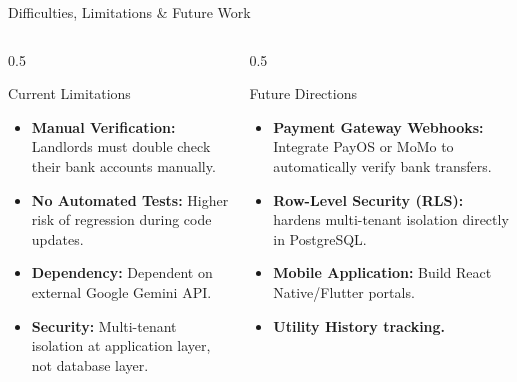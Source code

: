 \documentclass[10pt]{beamer}
\begin{document}
\begin{frame}{Difficulties, Limitations \& Future Work}
    \begin{columns}
        \begin{column}{0.5\textwidth}
            \begin{block}{Current Limitations}
                \begin{itemize}
                    \item \textbf{Manual Verification:} Landlords must double check their bank accounts manually.
                    \item \textbf{No Automated Tests:} Higher risk of regression during code updates.
                    \item \textbf{Dependency:} Dependent on external Google Gemini API.
                    \item \textbf{Security:} Multi-tenant isolation at application layer, not database layer.
                \end{itemize}
            \end{block}
        \end{column}
        
        \begin{column}{0.5\textwidth}
            \begin{block}{Future Directions}
                \begin{itemize}
                    \item \textbf{Payment Gateway Webhooks:} Integrate PayOS or MoMo to automatically verify bank transfers.
                    \item \textbf{Row-Level Security (RLS):} hardens multi-tenant isolation directly in PostgreSQL.
                    \item \textbf{Mobile Application:} Build React Native/Flutter portals.
                    \item \textbf{Utility History tracking.}
                \end{itemize}
            \end{block}
        \end{column}
    \end{columns}
\end{frame}
\end{document}

